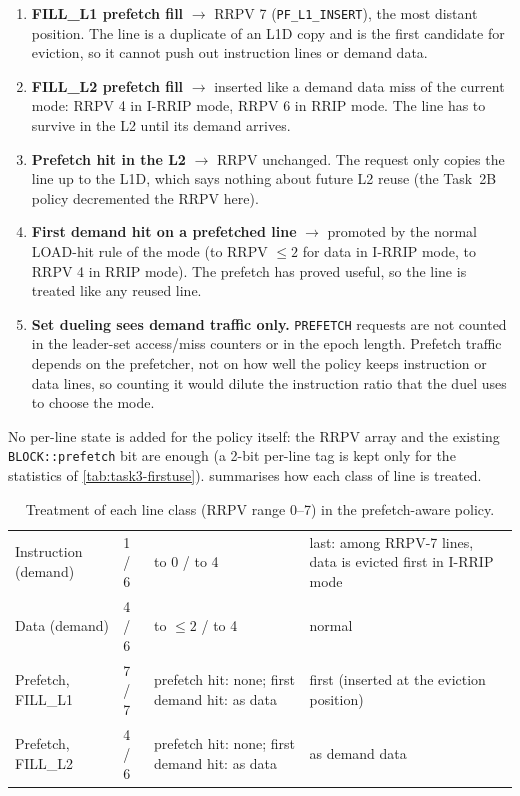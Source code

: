 \begin{enumerate}[nosep]
  \item \textbf{FILL\_L1 prefetch fill} $\rightarrow$ RRPV 7 (\texttt{PF\_L1\_INSERT}), the most distant
        position. The line is a duplicate of an L1D copy and is the first candidate for eviction, so it
        cannot push out instruction lines or demand data.
  \item \textbf{FILL\_L2 prefetch fill} $\rightarrow$ inserted like a demand data miss of the current mode:
        RRPV 4 in I-RRIP mode, RRPV 6 in RRIP mode. The line has to survive in the L2 until its demand arrives.
  \item \textbf{Prefetch hit in the L2} $\rightarrow$ RRPV unchanged. The request only copies the line up
        to the L1D, which says nothing about future L2 reuse (the Task~2B policy decremented the RRPV here).
  \item \textbf{First demand hit on a prefetched line} $\rightarrow$ promoted by the normal LOAD-hit rule of
        the mode (to RRPV $\le 2$ for data in I-RRIP mode, to RRPV 4 in RRIP mode). The prefetch has
        proved useful, so the line is treated like any reused line.
  \item \textbf{Set dueling sees demand traffic only.} \texttt{PREFETCH} requests are not counted in the
        leader-set access/miss counters or in the epoch length. Prefetch traffic depends on the
        prefetcher, not on how well the policy keeps instruction or data lines, so counting it would
        dilute the instruction ratio that the duel uses to choose the mode.
\end{enumerate}
No per-line state is added for the policy itself: the RRPV array and the existing
\texttt{BLOCK::\allowbreak prefetch} bit are enough (a 2-bit per-line tag is kept only for the statistics of
\cref{tab:task3-firstuse}).  summarises how each class of line is treated.

\begin{table}[htbp]
\centering
\caption{Treatment of each line class (RRPV range 0--7) in the prefetch-aware policy.}\label{tab:task3-policy}
\tablesetup
\begin{tabularx}{\linewidth}{lLLL}
\toprule
{} &  &  &  \\
\midrule
Instruction (demand)     & 1 / 6 & to 0 / to 4 & last: among RRPV-7 lines, data is evicted first in I-RRIP mode \\
Data (demand)            & 4 / 6 & to $\le 2$ / to 4 & normal \\
Prefetch, FILL\_L1       & 7 / 7 & prefetch hit: none; first demand hit: as data & first (inserted at the eviction position) \\
Prefetch, FILL\_L2       & 4 / 6 & prefetch hit: none; first demand hit: as data & as demand data \\
\bottomrule
\end{tabularx}
\end{table}


